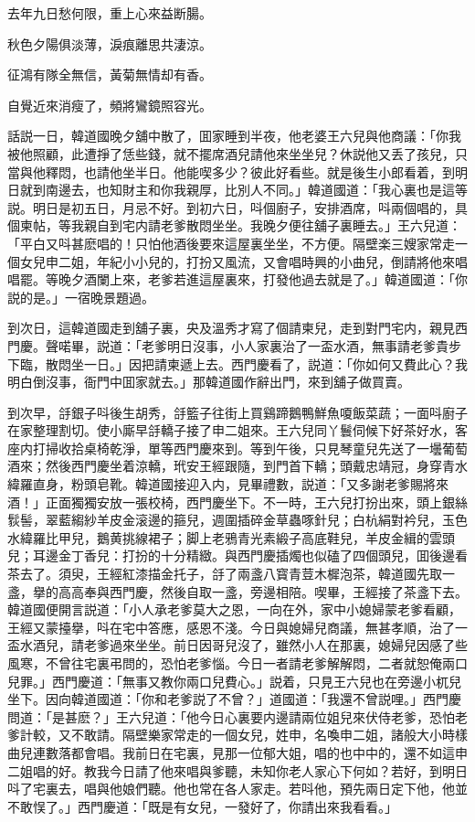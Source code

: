 去年九日愁何限，重上心來益断腸。

秋色夕陽俱淡薄，淚痕離思共淒涼。

征鴻有隊全無信，黃菊無情却有香。

自覺近來消瘦了，頻將鸞鏡照容光。

話説一日，韓道國晚夕舖中散了，囬家睡到半夜，他老婆王六兒與他商議：「你我被他照顧，此遭掙了恁些錢，就不擺席酒兒請他來坐坐兒？休説他又丢了孩兒，只當與他釋悶，也請他坐半日。他能喫多少？彼此好看些。就是後生小郎看着，到明日就到南邊去，也知財主和你我親厚，比別人不同。」韓道國道：「我心裏也是這等説。明日是初五日，月忌不好。到初六日，呌個廚子，安排酒席，呌兩個唱的，具個柬帖，等我親自到宅内請老爹散悶坐坐。我晚夕便往舖子裏睡去。」王六兒道：「平白又呌甚麽唱的！只怕他酒後要來這屋裏坐坐，不方便。隔壁楽三嫂家常走一個女兒申二姐，年紀小小兒的，打扮又風流，又會唱時興的小曲兒，倒請將他來唱唱罷。等晚夕酒闌上來，老爹若進這屋裏來，打發他過去就是了。」韓道國道：「你説的是。」一宿晚景題過。

到次日，這韓道國走到舖子裏，央及溫秀才寫了個請柬兒，走到對門宅内，親見西門慶。聲喏畢，説道：「老爹明日沒事，小人家裏治了一盃水酒，無事請老爹貴步下臨，散悶坐一日。」因把請柬遞上去。西門慶看了，説道：「你如何又費此心？我明白倒沒事，衙門中囬家就去。」那韓道國作辭出門，來到舖子做買賣。

到次早，㧱銀子呌後生胡秀，㧱籃子往街上買鷄蹄鵝鴨鮮魚嗄飯菜蔬；一面呌廚子在家整理割切。使小廝早㧱轎子接了申二姐來。王六兒同丫鬟伺候下好茶好水，客座内打掃收拾桌椅乾淨，單等西門慶來到。等到午後，只見琴童兒先送了一壜葡萄酒來；然後西門慶坐着涼轎，玳安王經跟隨，到門首下轎；頭戴忠靖冠，身穿青水緯羅直身，粉頭皂靴。韓道國接迎入内，見畢禮數，説道：「又多謝老爹賜將來酒！」正面獨獨安放一張校椅，西門慶坐下。不一時，王六兒打扮出來，頭上銀絲䯼髻，翠藍縐紗羊皮金滚邊的箍兒，週圍插碎金草蟲啄針兒；白杭絹對衿兒，玉色水緯羅比甲兒，鵝黄挑線裙子；脚上老鴉青光素緞子高底鞋兒，羊皮金緝的雲頭兒；耳邊金丁香兒：打扮的十分精緻。與西門慶插燭也似磕了四個頭兒，囬後邊看茶去了。須臾，王經紅漆描金托子，㧱了兩盞八寳青荳木樨泡茶，韓道國先取一盞，擧的高高奉與西門慶，然後自取一盞，旁邊相陪。喫畢，王經接了茶盞下去。韓道國便開言説道：「小人承老爹莫大之恩，一向在外，家中小媳婦蒙老爹看顧，王經又蒙擡擧，呌在宅中答應，感恩不淺。今日與媳婦兒商議，無甚孝順，治了一盃水酒兒，請老爹過來坐坐。前日因哥兒沒了，雖然小人在那裏，媳婦兒因感了些風寒，不曾往宅裏弔問的，恐怕老爹惱。今日一者請老爹解解悶，二者就恕俺兩口兒罪。」西門慶道：「無事又教你兩口兒費心。」説着，只見王六兒也在旁邊小杌兒坐下。因向韓道國道：「你和老爹説了不曾？」道國道：「我還不曾説哩。」西門慶問道：「是甚麽？」王六兒道：「他今日心裏要内邊請兩位姐兒來伏侍老爹，恐怕老爹計較，又不敢請。隔壁樂家常走的一個女兒，姓申，名喚申二姐，諸般大小時樣曲兒連數落都會唱。我前日在宅裏，見那一位郁大姐，唱的也中中的，還不如這申二姐唱的好。教我今日請了他來唱與爹聽，未知你老人家心下何如？若好，到明日呌了宅裏去，唱與他娘們聽。他也常在各人家走。若呌他，預先兩日定下他，他並不敢悮了。」西門慶道：「既是有女兒，一發好了，你請出來我看看。」

